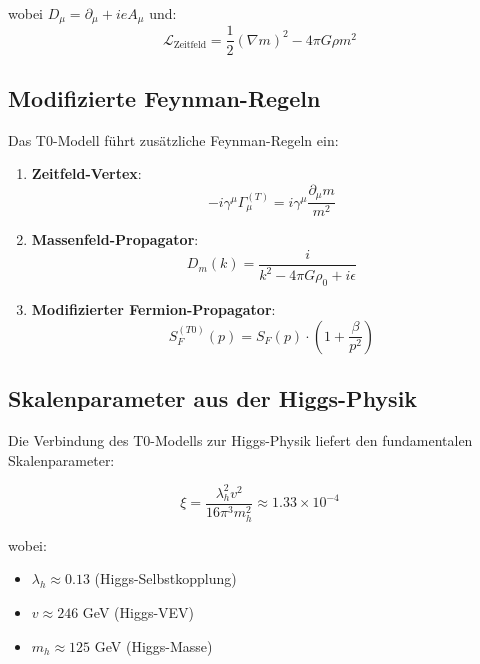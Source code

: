 \documentclass[12pt,a4paper]{article}
\begin{document}
wobei $D_{\mu} = \partial_{\mu} + ie A_{\mu}$ und:
\begin{equation}
	\mathcal{L}_{\text{Zeitfeld}} = \frac{1}{2}(\nabla m)^2 - 4\pi G \rho m^2
	\label{eq:zeitfeld_lagrangian}
\end{equation}

\subsection{Modifizierte Feynman-Regeln}
\label{subsec:modifizierte_feynman_regeln}

Das T0-Modell führt zusätzliche Feynman-Regeln ein:

\begin{enumerate}
	\item \textbf{Zeitfeld-Vertex}: 
	\begin{equation}
		-i\gamma^{\mu}\Gamma_{\mu}^{(T)} = i\gamma^{\mu}\frac{\partial_{\mu} m}{m^2}
		\label{eq:zeitfeld_vertex}
	\end{equation}
	
	\item \textbf{Massenfeld-Propagator}:
	\begin{equation}
		D_m(k) = \frac{i}{k^2 - 4\pi G \rho_0 + i\epsilon}
		\label{eq:massen_propagator}
	\end{equation}
	
	\item \textbf{Modifizierter Fermion-Propagator}:
	\begin{equation}
		S_F^{(T0)}(p) = S_F(p) \cdot \left(1 + \frac{\beta}{p^2}\right)
		\label{eq:modifizierter_fermion_propagator}
	\end{equation}
\end{enumerate}

\subsection{Skalenparameter aus der Higgs-Physik}
\label{subsec:skalenparameter_higgs}

Die Verbindung des T0-Modells zur Higgs-Physik liefert den fundamentalen Skalenparameter:

\begin{equation}
	\xi = \frac{\lambda_h^2 v^2}{16\pi^3 m_h^2} \approx 1.33 \times 10^{-4}
	\label{eq:xi_higgs_abgeleitet}
\end{equation}

wobei:
\begin{itemize}
	\item $\lambda_h \approx 0.13$ (Higgs-Selbstkopplung)
	\item $v \approx 246$ GeV (Higgs-VEV)
	\item $m_h \approx 125$ GeV (Higgs-Masse)
\end{itemize}
\end{document}
